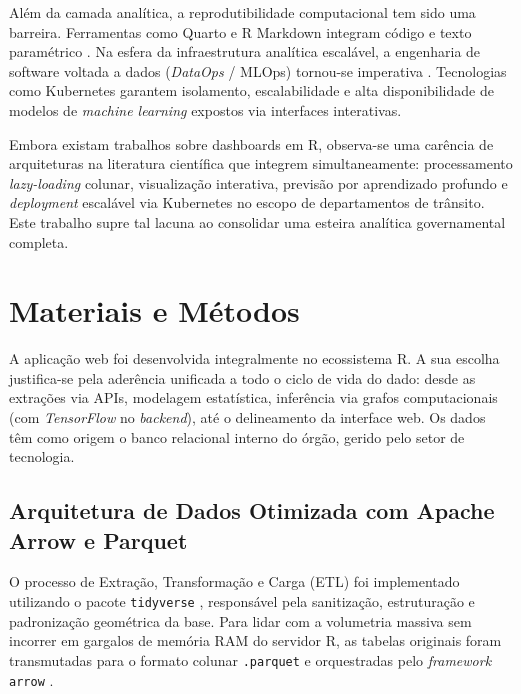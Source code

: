\documentclass[10pt,conference]{IEEEtran}
\begin{document}
Além da camada analítica, a reprodutibilidade computacional tem sido uma barreira. Ferramentas como Quarto e R Markdown integram código e texto paramétrico \cite{xie2018}. Na esfera da infraestrutura analítica escalável, a engenharia de software voltada a dados (\textit{DataOps} / MLOps) tornou-se imperativa \cite{humble2010}. Tecnologias como Kubernetes \cite{burns2016borgomega} garantem isolamento, escalabilidade e alta disponibilidade de modelos de \textit{machine learning} expostos via interfaces interativas.

Embora existam trabalhos sobre dashboards em R, observa-se uma carência de arquiteturas na literatura científica que integrem simultaneamente: processamento \textit{lazy-loading} colunar, visualização interativa, previsão por aprendizado profundo e \textit{deployment} escalável via Kubernetes no escopo de departamentos de trânsito. Este trabalho supre tal lacuna ao consolidar uma esteira analítica governamental completa.


\section{Materiais e Métodos}

A aplicação web foi desenvolvida integralmente no ecossistema R. A sua escolha justifica-se pela aderência unificada a todo o ciclo de vida do dado: desde as extrações via APIs, modelagem estatística, inferência via grafos computacionais (com \textit{TensorFlow} no \textit{backend}), até o delineamento da interface web. Os dados têm como origem o banco relacional interno do órgão, gerido pelo setor de tecnologia.

\subsection{Arquitetura de Dados Otimizada com Apache Arrow e Parquet}

O processo de Extração, Transformação e Carga (ETL) foi implementado utilizando o pacote \texttt{tidyverse} \cite{tidyverse2019}, responsável pela sanitização, estruturação e padronização geométrica da base. Para lidar com a volumetria massiva sem incorrer em gargalos de memória RAM do servidor R, as tabelas originais foram transmutadas para o formato colunar \texttt{.parquet} e orquestradas pelo \textit{framework} \texttt{arrow} \cite{arrow2026}. 
\end{document}
